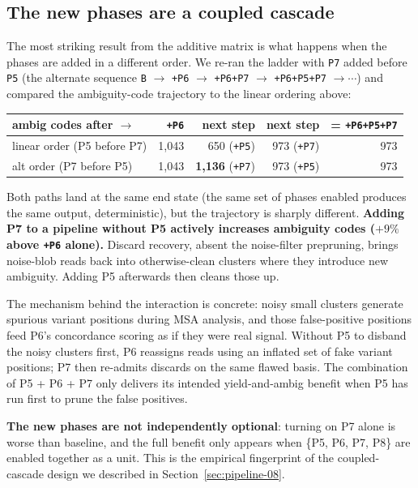 \documentclass[11pt]{article}
\begin{document}
\subsection{The new phases are a coupled cascade}
\label{sec:results-cascade}

The most striking result from the additive matrix is what happens when
the phases are added in a different order. We re-ran the ladder with
\texttt{P7} added before \texttt{P5} (the alternate sequence
\texttt{B} $\to$ \texttt{+P6} $\to$ \texttt{+P6+P7} $\to$
\texttt{+P6+P5+P7} $\to \cdots$) and compared the ambiguity-code
trajectory to the linear ordering above:

\begin{center}
\begin{tabular}{l rrrr}
\toprule
ambig codes after $\to$ & \texttt{+P6} & next step & next step & = \texttt{+P6+P5+P7} \\
\midrule
linear order (P5 before P7) & 1,043 & 650 (\texttt{+P5}) & 973 (\texttt{+P7}) & 973 \\
alt order (P7 before P5) & 1,043 & \textbf{1,136} (\texttt{+P7}) & 973 (\texttt{+P5}) & 973 \\
\bottomrule
\end{tabular}
\end{center}

Both paths land at the same end state (the same set of phases enabled
produces the same output, deterministic), but the trajectory is sharply
different. \textbf{Adding P7 to a pipeline without P5 actively increases
ambiguity codes ($+9\%$ above \texttt{+P6} alone).} Discard recovery,
absent the noise-filter prepruning, brings noise-blob reads back into
otherwise-clean clusters where they introduce new ambiguity. Adding P5
afterwards then cleans those up.

The mechanism behind the interaction is concrete: noisy small clusters
generate spurious variant positions during MSA analysis, and those
false-positive positions feed P6's concordance scoring as if they were
real signal. Without P5 to disband the noisy clusters first, P6 reassigns
reads using an inflated set of fake variant positions; P7 then re-admits
discards on the same flawed basis. The combination of P5 + P6 + P7 only
delivers its intended yield-and-ambig benefit when P5 has run first to
prune the false positives.

\textbf{The new phases are not independently optional}: turning on P7
alone is worse than baseline, and the full benefit only appears when
\{P5, P6, P7, P8\} are enabled together as a unit. This is the
empirical fingerprint of the coupled-cascade design we described in
Section~\ref{sec:pipeline-08}.
\end{document}
